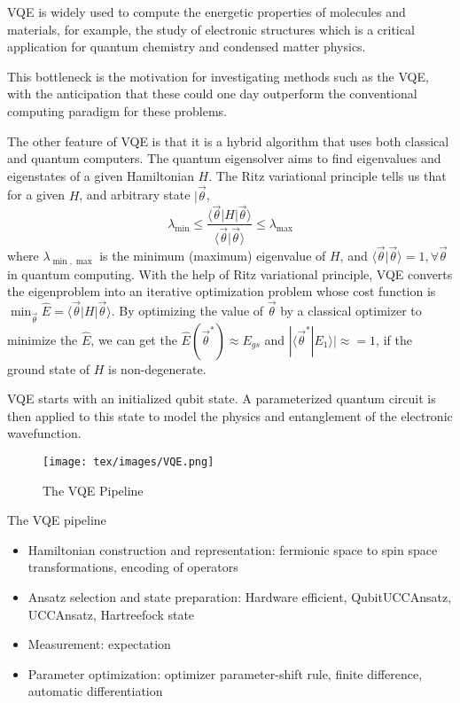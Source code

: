VQE is widely used to compute the energetic properties of molecules and materials, for example, the study of electronic structures which is a critical application for quantum chemistry and condensed matter physics.

This bottleneck is the motivation for investigating methods such as the VQE, with the anticipation that these could one day outperform the conventional computing paradigm for these problems.


The other feature of VQE is that it is a hybrid algorithm that uses both classical and quantum computers.
The quantum eigensolver aims to find eigenvalues and eigenstates of a given Hamiltonian $H$.
The Ritz variational principle tells us that for a given $H$, and arbitrary state $|\vec{\theta}$,
\begin{equation}
    \lambda_{\min}\leq \frac{\langle \vec{\theta} |H| \vec{\theta}\rangle}{\langle \vec{\theta}|\vec{\theta}\rangle} \leq \lambda_{\max}
\end{equation}
where $\lambda_{\min, \max}$ is the minimum (maximum) eigenvalue of $H$, and $\langle \vec{\theta}|\vec{\theta}\rangle = 1, \forall \vec{\theta}$ in quantum computing.
With the help of Ritz variational principle, VQE converts the eigenproblem into an iterative optimization problem whose cost function is $\min_{\vec{\theta}}\hat{E}= \langle \vec{\theta} |H| \vec{\theta}\rangle$.
By optimizing the value of $\vec{\theta}$ by a classical optimizer to minimize the $\hat{E}$, we can get the $\hat{E}(\vec{\theta}^*)\approx E_{gs}$ and $|\langle \vec{\theta}^*|E_1\rangle| \approx = 1$, if the ground state of $H$ is non-degenerate.

VQE starts with an initialized qubit state. A parameterized quantum circuit is then applied to this state to model the physics and entanglement of the electronic wavefunction.

\begin{figure*}
    \centering
    \texttt{[image: tex/images/VQE.png]}
    \caption{The VQE Pipeline}
    \label{fig:enter-label}
\end{figure*}

The VQE pipeline
\begin{itemize}
    \item Hamiltonian construction and representation: fermionic space to spin space transformations, encoding of operators
    
    \item Ansatz selection and state preparation: Hardware efficient, QubitUCCAnsatz, UCCAnsatz, Hartreefock state
    \item Measurement: expectation
    \item Parameter optimization: optimizer parameter-shift rule, finite difference, automatic differentiation
\end{itemize}


